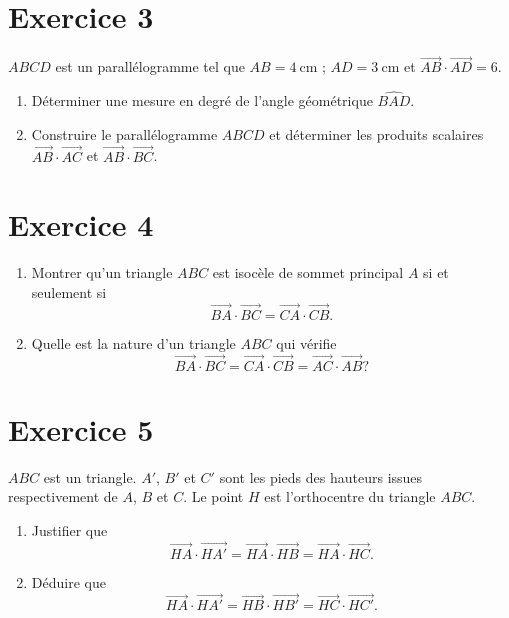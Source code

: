 \documentclass[12pt]{article}
\begin{document}
\section*{Exercice 3}

$ABCD$ est un parallélogramme tel que $AB = 4\ \text{cm}$ ; $AD = 3\ \text{cm}$ et $\overrightarrow{AB} \cdot \overrightarrow{AD} = 6$.
\begin{enumerate}
    \item Déterminer une mesure en degré de l’angle géométrique $\widehat{BAD}$.
    \item Construire le parallélogramme $ABCD$ et déterminer les produits scalaires $\overrightarrow{AB} \cdot \overrightarrow{AC}$ et $\overrightarrow{AB} \cdot \overrightarrow{BC}$.
\end{enumerate}
\section*{Exercice 4}

\begin{enumerate}
    \item Montrer qu’un triangle $ABC$ est isocèle de sommet principal $A$ si et seulement si
    \[
    \overrightarrow{BA} \cdot \overrightarrow{BC} = \overrightarrow{CA} \cdot \overrightarrow{CB}.
    \]

    \item Quelle est la nature d’un triangle $ABC$ qui vérifie
    \[
    \overrightarrow{BA} \cdot \overrightarrow{BC} = \overrightarrow{CA} \cdot \overrightarrow{CB} = \overrightarrow{AC} \cdot \overrightarrow{AB}?
    \]
\end{enumerate}

\section*{Exercice 5}

$ABC$ est un triangle. $A'$, $B'$ et $C'$ sont les pieds des hauteurs issues respectivement de $A$, $B$ et $C$. Le point $H$ est l’orthocentre du triangle $ABC$.

\begin{enumerate}
    \item Justifier que 
    \[
    \overrightarrow{HA} \cdot \overrightarrow{HA'} = \overrightarrow{HA} \cdot \overrightarrow{HB} = \overrightarrow{HA} \cdot \overrightarrow{HC}.
    \]

    \item Déduire que 
    \[
    \overrightarrow{HA} \cdot \overrightarrow{HA'} = \overrightarrow{HB} \cdot \overrightarrow{HB'} = \overrightarrow{HC} \cdot \overrightarrow{HC'}.
    \]
\end{enumerate}
\end{document}
